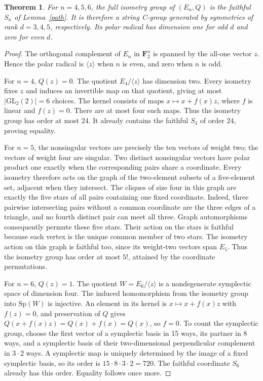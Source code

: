 \documentclass[11pt,a4paper]{article}
\newtheorem{theorem}[lemma]{Theorem}
\newcommand{\gen}[1]{\langle#1\rangle}
\begin{document}
\begin{theorem}
For $n=4,5,6$, the full isometry group of $(E_n,Q)$ is the
faithful $S_n$ of Lemma~\ref{path}. It is therefore a string
C-group generated by symmetries of rank $d=3,4,5$, respectively.
Its polar radical has dimension one for odd $d$ and zero for
even $d$.
\end{theorem}
\begin{proof}
The orthogonal complement of $E_n$ in $\mathbf F_2^n$ is
spanned by the all-one vector $z$. Hence the polar radical is
$\gen{z}$ when $n$ is even, and zero when $n$ is odd.

For $n=4$, $Q(z)=0$. The quotient $E_4/\gen z$ has dimension
two. Every isometry fixes $z$ and induces an invertible map on
that quotient, giving at most $|\mathrm{GL}_2(2)|=6$ choices.
The kernel consists of maps $x\mapsto x+f(x)z$, where $f$ is
linear and $f(z)=0$. There are at most four such maps. Thus
the isometry group has order at most 24. It already contains
the faithful $S_4$ of order 24, proving equality.

For $n=5$, the nonsingular vectors are precisely the ten
vectors of weight two; the vectors of weight four are singular.
Two distinct nonsingular vectors have polar product one
exactly when the corresponding pairs share a coordinate.
Every isometry therefore acts on the graph of the two-element
subsets of a five-element set, adjacent when they intersect.
The cliques of size four in this graph are exactly the five
stars of all pairs containing one fixed coordinate. Indeed,
three pairwise intersecting pairs without a common coordinate
are the three edges of a triangle, and no fourth distinct pair
can meet all three. Graph automorphisms consequently permute
these five stars. Their action on the stars is faithful because
each vertex is the unique common member of two stars.
The isometry action on this graph is faithful too, since its
weight-two vectors span $E_5$. Thus the isometry group has
order at most $5!$, attained by the coordinate permutations.

For $n=6$, $Q(z)=1$. The quotient $W=E_6/\gen z$ is a
nondegenerate symplectic space of dimension four. The induced
homomorphism from the isometry group into $\mathrm{Sp}(W)$
is injective. An element in its kernel is
$x\mapsto x+f(x)z$ with $f(z)=0$, and preservation of $Q$
gives $Q(x+f(x)z)=Q(x)+f(x)=Q(x)$, so $f=0$.
To count the symplectic group, choose the first vector of a
symplectic basis in 15 ways, its partner in 8 ways, and a
symplectic basis of their two-dimensional perpendicular
complement in $3\cdot2$ ways. A symplectic map is uniquely
determined by the image of a fixed symplectic basis, so its
order is $15\cdot8\cdot3\cdot2=720$. The faithful coordinate
$S_6$ already has this order. Equality follows once more.
\end{proof}
\end{document}
